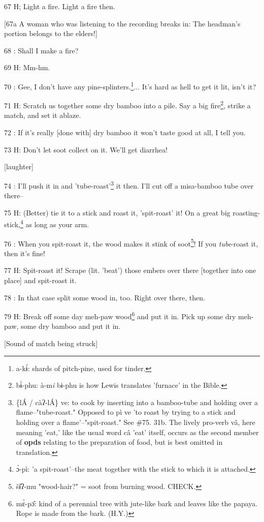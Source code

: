 67 H; Light a fire. Light a fire then.

[67a A woman who was listening to the recording breaks in: The headman's portion
belongs to the elders!]

68  : Shall I make a fire?

69 H: Mm-hm.

70  : Gee, I don't have any pine-splinters.\footnote{a-kɨ́: shards of pitch-pine, used for tinder.}... It's hard as hell to get it
lit, isn't it?

71 H: Scratch us together some dry bamboo into a pile. Say a big fire\footnote{bɨ̀-phu: à-m\emph{i} bɨ-phu is how Lewis translates 'furnace' in the Bible.}, strike
a match, and set it ablaze.

72  : If it's really [done with] dry bamboo it won't taste good at all, I tell
you.

73 H: Don't let soot collect on it. We'll get diarrhea!

[laughter]

74  : I'll push it in and 'tube-roast'\footnote{\{lÁ / càʔ-lÁ\} ve: to cook by inserting into a bamboo-tube and holding over a flame--"tube-roast." Opposed to pì ve 'to roast by trying to a stick and holding over a flame'--"spit-roast." See \#75.  31b. The lively pro-verb vâ, here meaning 'eat,' like the usual word câ 'eat' itself, occurs as the second member of \textbf{opds} relating to the preparation of food, but is best omitted in translation.} it then. I'll cut off a misa-bamboo
tube over there--

75 H: (Better) tie it to a stick and roast it, 'spit-roast' it! On a great big
roasting-stick,\footnote{ɔ̀-pì: 'a spit-roast'--the meat together with the stick to which it is attached.} as long as your arm.

76  : When you spit-roast it, the wood makes it stink of soot\footnote{šɨ̂ʔ-mu "wood-hair?" = soot from burning wood. CHECK.}! If you \emph{tube}-roast
it, then it's fine!

77 H: Spit-roast it! Scrape (lit. 'beat') those embers over there [together into
one place] and spit-roast it.

78  : In that case split some wood in, too. Right over there, then.

79 H: Break off some day meh-paw wood\footnote{mɛ̀-pɔ̂: kind of a perennial tree with jute-like bark and leaves like the papaya. Rope is made from the bark. (H.Y.)} and put it in. Pick up some dry meh-paw,
some dry bamboo and put it in.

[Sound of match being struck]

